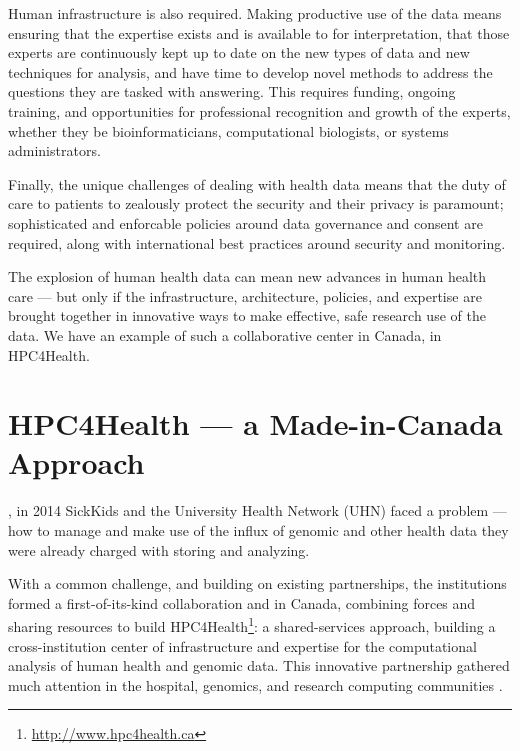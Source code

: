 \documentclass[twoside,symmetric,sfsidenotes,notoc]{tufte-book}
\begin{document}
Human infrastructure is also required.  Making productive use of the 
data means ensuring that the expertise exists and is available to for interpretation,
that those experts are continuously kept up to date on the new types of data
and new techniques for analysis, and have time to develop novel methods to address
the questions they are tasked with answering.  This requires funding, ongoing training,
and opportunities for professional recognition and growth of the experts, whether
they be bioinformaticians, computational biologists, or systems administrators.

Finally, the unique challenges of dealing with health data means that the duty
of care to patients to zealously protect the security and their privacy is
paramount; sophisticated and enforcable policies around data governance and consent
are required, along with international best practices around security and monitoring.

The explosion of human health data can mean new advances in human health care ---
but only if the infrastructure, architecture, policies, and expertise are brought
together in innovative ways to make effective, safe research use of the data.
We have an example of such a collaborative center in Canada, in HPC4Health.

\chapter{HPC4Health --- a Made-in-Canada Approach}
\label{ch:hpc4health}

, in 2014 SickKids and 
the University Health Network (UHN) faced a problem --- how to manage and make use of the influx 
of genomic and other health data they were already charged with storing and analyzing.

With a common challenge, and building on existing partnerships, the institutions formed a
first-of-its-kind collaboration and in Canada, combining forces and sharing
resources to build HPC4Health\footnote{\url{http://www.hpc4health.ca}}: a
shared-services approach, building a cross-institution center
of infrastructure and expertise
for the computational analysis of human health and genomic data.  This innovative 
partnership gathered much attention in the hospital, genomics, and 
research computing communities \citep{hn-hpc4health, gw-hpc4health, inside-hpc-h4h-mellanox, openstack-hpc}.
\end{document}
